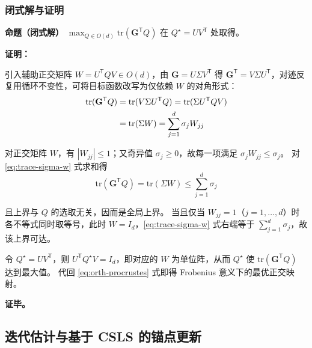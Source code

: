 \documentclass[withoutpreface]{cumcmthesis}
\begin{document}
\subsubsection{闭式解与证明}
\textbf{命题（闭式解）} $\displaystyle\max_{Q\in O(d)}\mathrm{tr}(\mathbf{G}^{\mathsf{T}}Q)$ 在 $Q^\star=UV^{\mathsf{T}}$ 处取得。

\textbf{证明： }

引入辅助正交矩阵 $W=U^{\mathsf{T}}QV\in O(d)$，由 $\mathbf{G}=U\Sigma V^{\mathsf{T}}$ 得 $\mathbf{G}^{\mathsf{T}}=V\Sigma U^{\mathsf{T}}$，对迹反复用循环不变性，可将目标函数改写为仅依赖 $W$ 的对角形式：
\begin{align}
  \mathrm{tr}(\mathbf{G}^{\mathsf{T}}Q)
  &= \mathrm{tr}(V\Sigma U^{\mathsf{T}}Q)
   = \mathrm{tr}(\Sigma U^{\mathsf{T}}QV) \notag\\
  &= \mathrm{tr}(\Sigma W)
   = \sum_{j=1}^{d} \sigma_j W_{jj}
  \label{eq:trace-sigma-w}
\end{align}

对正交矩阵 $W$，有 $|W_{jj}|\le 1$；又奇异值 $\sigma_j\ge 0$，故每一项满足 $\sigma_j W_{jj}\le \sigma_j$。
对 \eqref{eq:trace-sigma-w} 式求和得
\begin{equation}
  \mathrm{tr}(\mathbf{G}^{\mathsf{T}}Q)=\mathrm{tr}(\Sigma W)\le\sum_{j=1}^{d}\sigma_j
\end{equation}

且上界与 $Q$ 的选取无关，因而是全局上界。
当且仅当 $W_{jj}=1$（$j=1,\ldots,d$）时各不等式同时取等号，此时 $W=I_d$，\eqref{eq:trace-sigma-w} 
式右端等于 $\sum_{j=1}^{d}\sigma_j$，故该上界可达。

令 $Q^\star=UV^{\mathsf{T}}$，则 $U^{\mathsf{T}}Q^\star V=I_d$，即对应的 $W$ 为单位阵，从而 $Q^\star$ 使 $\mathrm{tr}(\mathbf{G}^{\mathsf{T}}Q)$ 达到最大值。
代回 \eqref{eq:orth-procrustes} 式即得 Frobenius 意义下的最优正交映射。

\textbf{证毕。}

\subsection{迭代估计与基于 CSLS 的锚点更新}
\end{document}
